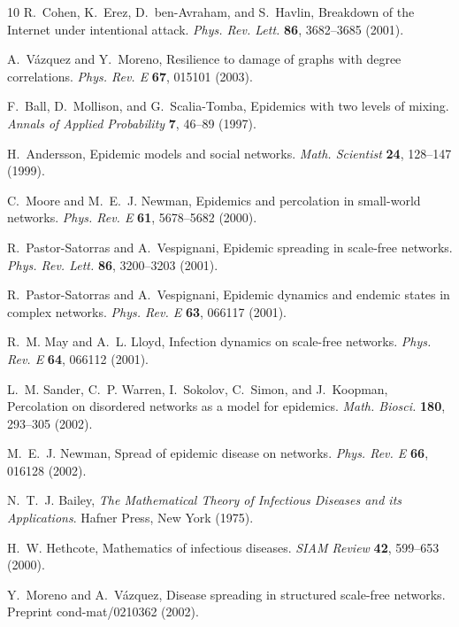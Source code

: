 \documentclass[twocolumn,pre]{revtex4}
\begin{document}
\begin{thebibliography}{10}
R.~Cohen, K.~Erez, D.~{ben-Avraham}, and S.~Havlin, Breakdown of the {I}nternet
  under intentional attack. \textit{Phys. Rev. Lett.} \textbf{86}, 3682--3685
  (2001).

A.~V\'azquez and Y.~Moreno, Resilience to damage of graphs with degree
  correlations. \textit{Phys. Rev. E} \textbf{67}, 015101 (2003).

F.~Ball, D.~Mollison, and G.~Scalia-Tomba, Epidemics with two levels of mixing.
  \textit{Annals of Applied Probability} \textbf{7}, 46--89 (1997).

H.~Andersson, Epidemic models and social networks. \textit{Math. Scientist}
  \textbf{24}, 128--147 (1999).

C.~Moore and M.~E.~J. Newman, Epidemics and percolation in small-world
  networks. \textit{Phys. Rev. E} \textbf{61}, 5678--5682 (2000).

R.~Pastor-Satorras and A.~Vespignani, Epidemic spreading in scale-free
  networks. \textit{Phys. Rev. Lett.} \textbf{86}, 3200--3203 (2001).

R.~Pastor-Satorras and A.~Vespignani, Epidemic dynamics and endemic states in
  complex networks. \textit{Phys. Rev. E} \textbf{63}, 066117 (2001).

R.~M. May and A.~L. Lloyd, Infection dynamics on scale-free networks.
  \textit{Phys. Rev. E} \textbf{64}, 066112 (2001).

L.~M. Sander, C.~P. Warren, I.~Sokolov, C.~Simon, and J.~Koopman, Percolation
  on disordered networks as a model for epidemics. \textit{Math. Biosci.}
  \textbf{180}, 293--305 (2002).

M.~E.~J. Newman, Spread of epidemic disease on networks. \textit{Phys. Rev. E}
  \textbf{66}, 016128 (2002).

N.~T.~J. Bailey, \textit{The Mathematical Theory of Infectious Diseases and its
  Applications}. Hafner Press, New York (1975).

H.~W. Hethcote, Mathematics of infectious diseases. \textit{SIAM Review}
  \textbf{42}, 599--653 (2000).

Y.~Moreno and A.~V\'azquez, Disease spreading in structured scale-free
  networks. Preprint cond-mat/0210362 (2002).

\end{thebibliography}
\end{document}
